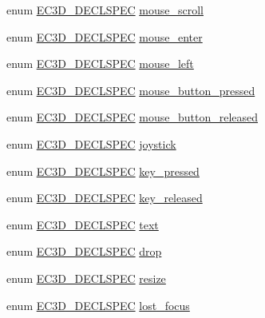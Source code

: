 \begin{DoxyCompactItemize}
enum \mbox{\hyperlink{_common_8h_aac42573e202ca3dd4d259c81691e2369}{E\+C3\+D\+\_\+\+D\+E\+C\+L\+S\+P\+EC}} \mbox{\hyperlink{namespaceec_a7fb336f49377247955ebd3f6658ba50b}{mouse\+\_\+scroll}}
\item 
enum \mbox{\hyperlink{_common_8h_aac42573e202ca3dd4d259c81691e2369}{E\+C3\+D\+\_\+\+D\+E\+C\+L\+S\+P\+EC}} \mbox{\hyperlink{namespaceec_a7b76ba0c0ae46329abe1fc22115ab729}{mouse\+\_\+enter}}
\item 
enum \mbox{\hyperlink{_common_8h_aac42573e202ca3dd4d259c81691e2369}{E\+C3\+D\+\_\+\+D\+E\+C\+L\+S\+P\+EC}} \mbox{\hyperlink{namespaceec_a5fd84b2204156e6d2e500dfd83ea2b4b}{mouse\+\_\+left}}
\item 
enum \mbox{\hyperlink{_common_8h_aac42573e202ca3dd4d259c81691e2369}{E\+C3\+D\+\_\+\+D\+E\+C\+L\+S\+P\+EC}} \mbox{\hyperlink{namespaceec_a4b2a6409d34d7e07233d26b19bf3540c}{mouse\+\_\+button\+\_\+pressed}}
\item 
enum \mbox{\hyperlink{_common_8h_aac42573e202ca3dd4d259c81691e2369}{E\+C3\+D\+\_\+\+D\+E\+C\+L\+S\+P\+EC}} \mbox{\hyperlink{namespaceec_af6e3c23e9650c9ecfd41cfd817f1a068}{mouse\+\_\+button\+\_\+released}}
\item 
enum \mbox{\hyperlink{_common_8h_aac42573e202ca3dd4d259c81691e2369}{E\+C3\+D\+\_\+\+D\+E\+C\+L\+S\+P\+EC}} \mbox{\hyperlink{namespaceec_a48a4c5a1e957c8419028491291e37634}{joystick}}
\item 
enum \mbox{\hyperlink{_common_8h_aac42573e202ca3dd4d259c81691e2369}{E\+C3\+D\+\_\+\+D\+E\+C\+L\+S\+P\+EC}} \mbox{\hyperlink{namespaceec_a6db9eda8a1039ccbbc883b1156c6c838}{key\+\_\+pressed}}
\item 
enum \mbox{\hyperlink{_common_8h_aac42573e202ca3dd4d259c81691e2369}{E\+C3\+D\+\_\+\+D\+E\+C\+L\+S\+P\+EC}} \mbox{\hyperlink{namespaceec_a8ec308d52dd60f3bc270fc07a113bd67}{key\+\_\+released}}
\item 
enum \mbox{\hyperlink{_common_8h_aac42573e202ca3dd4d259c81691e2369}{E\+C3\+D\+\_\+\+D\+E\+C\+L\+S\+P\+EC}} \mbox{\hyperlink{namespaceec_a0bdee24285d69deca899e166b29c0150}{text}}
\item 
enum \mbox{\hyperlink{_common_8h_aac42573e202ca3dd4d259c81691e2369}{E\+C3\+D\+\_\+\+D\+E\+C\+L\+S\+P\+EC}} \mbox{\hyperlink{namespaceec_ac1c8382601881db68a89d49d959b3fb8}{drop}}
\item 
enum \mbox{\hyperlink{_common_8h_aac42573e202ca3dd4d259c81691e2369}{E\+C3\+D\+\_\+\+D\+E\+C\+L\+S\+P\+EC}} \mbox{\hyperlink{namespaceec_a84e452d7f020435b50e2c18e7cdca968}{resize}}
\item 
enum \mbox{\hyperlink{_common_8h_aac42573e202ca3dd4d259c81691e2369}{E\+C3\+D\+\_\+\+D\+E\+C\+L\+S\+P\+EC}} \mbox{\hyperlink{namespaceec_af038c649a7c43904c7d37ba129f1b346}{lost\+\_\+focus}}

\end{DoxyCompactItemize}
